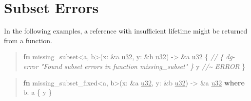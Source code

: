 \documentclass[
  11pt,
  twoside]{report}
\newenvironment{Shaded}{}{}
\newcommand{\CommentTok}[1]{\textit{#1}}
\newcommand{\DataTypeTok}[1]{\underline{#1}}
\newcommand{\KeywordTok}[1]{\textbf{#1}}
\newcommand{\NormalTok}[1]{#1}
\newcommand{\OperatorTok}[1]{#1}
\newcommand{\OtherTok}[1]{#1}
\begin{document}
\clearpage

\section{Subset Errors}\label{sec:subset-errors}

In the following examples, a reference with insufficient lifetime might
be returned from a function.

\begin{quote}
\begin{Shaded}
\begin{Highlighting}[]
\KeywordTok{fn}\NormalTok{ missing\_subset}\OperatorTok{\textless{}}\OtherTok{\textquotesingle{}a}\OperatorTok{,} \OtherTok{\textquotesingle{}b}\OperatorTok{\textgreater{}}\NormalTok{(x}\OperatorTok{:} \OperatorTok{\&}\OtherTok{\textquotesingle{}a} \DataTypeTok{u32}\OperatorTok{,}\NormalTok{ y}\OperatorTok{:} \OperatorTok{\&}\OtherTok{\textquotesingle{}b} \DataTypeTok{u32}\NormalTok{) }\OperatorTok{{-}\textgreater{}} \OperatorTok{\&}\OtherTok{\textquotesingle{}a} \DataTypeTok{u32} \OperatorTok{\{}
    \CommentTok{// \{ dg{-}error "Found subset errors in function missing\_subset" \} }
\NormalTok{    y }\CommentTok{//\textasciitilde{} ERROR}
\OperatorTok{\}}
\end{Highlighting}
\end{Shaded}
\end{quote}

\begin{quote}
\begin{Shaded}
\begin{Highlighting}[]
\KeywordTok{fn}\NormalTok{ missing\_subset\_fixed}\OperatorTok{\textless{}}\OtherTok{\textquotesingle{}a}\OperatorTok{,} \OtherTok{\textquotesingle{}b}\OperatorTok{\textgreater{}}\NormalTok{(x}\OperatorTok{:} \OperatorTok{\&}\OtherTok{\textquotesingle{}a} \DataTypeTok{u32}\OperatorTok{,}\NormalTok{ y}\OperatorTok{:} \OperatorTok{\&}\OtherTok{\textquotesingle{}b} \DataTypeTok{u32}\NormalTok{) }\OperatorTok{{-}\textgreater{}} \OperatorTok{\&}\OtherTok{\textquotesingle{}a} \DataTypeTok{u32}
    \KeywordTok{where} \OtherTok{\textquotesingle{}b}\OperatorTok{:} \OtherTok{\textquotesingle{}a} \OperatorTok{\{}
\NormalTok{    y}
\OperatorTok{\}}
\end{Highlighting}
\end{Shaded}
\end{quote}
\end{document}
